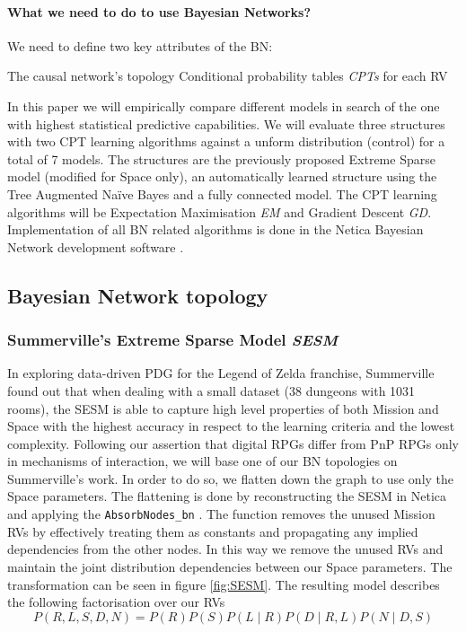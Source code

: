 \documentclass{UoYCSproject}
\begin{document}
\paragraph{What we need to do to use Bayesian Networks?}
We need to define two key attributes of the BN:
\begin{outline}[enumerate]
  \1 The causal network's topology
  \1 Conditional probability tables \textit{CPTs} for each RV
\end{outline}
In this paper we will empirically compare different models in search of the one with highest statistical predictive capabilities. We will evaluate three structures with two CPT learning algorithms against a unform distribution (control) for a total of 7 models. The structures are the previously proposed Extreme Sparse model \parencite{SummervilleSamplingHyrule} (modified for Space only), an automatically learned structure using the Tree Augmented Na\"{i}ve Bayes and a fully connected model. The CPT learning algorithms will be Expectation Maximisation \textit{EM} and Gradient Descent \textit{GD}. Implementation of all BN related algorithms is done in the Netica Bayesian Network development software \parencite{netica}.

\subsection{Bayesian Network topology}
\subsubsection{Summerville's Extreme Sparse Model \textit{SESM}}
In exploring data-driven PDG for the Legend of Zelda franchise, Summerville found out that when dealing with a small dataset (38 dungeons with 1031 rooms), the SESM is able to capture high level properties of both Mission and Space with the highest accuracy in respect to the learning criteria and the lowest complexity. Following our assertion that digital RPGs differ from PnP RPGs only in mechanisms of interaction, we will base one of our BN topologies on Summerville's work. In order to do so, we flatten down the graph to use only the Space parameters. The flattening is done by reconstructing the SESM in Netica and applying the \texttt{AbsorbNodes\_bn} \parencite[62-63]{neticaCman}. The function removes the unused Mission RVs by effectively treating them as constants and propagating any implied dependencies from the other nodes. In this way we remove the unused RVs and maintain the joint distribution dependencies between our Space parameters. The transformation can be seen in figure \ref{fig:SESM}. The resulting model describes the following factorisation over our RVs
\begin{equation}
  \label{eq:SESM}
  P(R,L,S,D,N) = P(R)P(S)P(L \mid R)P(D \mid R, L)P(N \mid D, S)
\end{equation}
\end{document}
